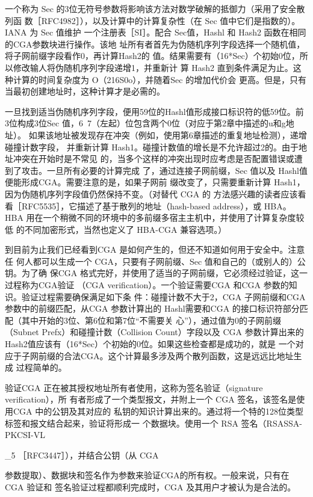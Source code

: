 一个称为 Sec 的3位无符号参数将影响该方法对数学破解的抵御力（采用了安全散列函
数［RFC4982］），以及计算中的计算复杂性（在 Sec 值中它们是指数的）。IANA 为 Sec 值维护
一个注册表［SI］。配合 Sec值，Hashl 和 Hash2 函数在相同的CGA参数块进行操作。该地
址所有者首先为伪随机序列字段选择一个随机值，将子网前缀字段看作0，再计算Hash2的
值。结果需要有（16*Sec）个初始0位，所以修改输人将伪随机序列字段递增1，并重新计
算 Hash2 直到条件满足为止。这种计算的时间复杂度为 O（216S0o），并随着Sec 的增加代价会
更高。但是，只有当最初创建地址时，这种计算才是必需的。

一旦找到适当伪随机序列字段，便用59位的Hashl值形成接口标识符的低59位。前
3位构成3位Sec 值，6~7（左起）位包含两个0位（对应于第2章中描述的u和g地址）。
如果该地址被发现存在冲突（例如，使用第6章描述的重复地址检测），递增碰撞计数字段，
并重新计算 Hash1。碰撞计数值的增长是不允许超过2的。由于地址冲突在开始时是不常见
的，当多个这样的冲突出现时应考虑是否配置错误或遭到了攻击。一旦所有必要的计算完成
了，通过连接子网前缀，Sec 值以及 Hashl值便能形成CGA。需要注意的是，如果子网前
缀改变了，只需要重新计算 Hash1，因为伪随机序列字段值仍然保持不变。（对替代 CGA 的
方法感兴趣的读者应该看看［RFC5535］，它描述了基于散列的地址（hash-based address），或
HBA。HBA 用在一个稍微不同的环境中的多前缀多宿主主机中，并使用了计算复杂度较低
的不同加密形式，当然也定义了 HBA-CGA 兼容选项。）

到目前为止我们已经看到CGA 是如何产生的，但还不知道如何用于安全中。注意任
何人都可以生成一个 CGA，只要有子网前缀、Sec 值和自己的（或别人的）公钥。为了确
保CGA 格式完好，并使用了适当的子网前缀，它必须经过验证，这一过程称为CGA验证
（CGA verification）。一个验证需要CGA 和CGA 参数的知识。验证过程需要确保满足如下条
件：碰撞计数不大于2，CGA 子网前缀和CGA 参数中的前缀匹配，从CGA 参数计算出的
Hashl需要和CGA 的接口标识符部分匹配（其中开始的3位、第6位和第7位“不需要关
心”），通过值为0的子网前缀（Subnet Prefx）和碰撞计数（Collision Count）字段以及 CGA
参数计算出来的 Hash2值应该有（16*Sec）个初始的0位。如果这些检查都是成功的，就是
一个对应于子网前缀的合法CGA。这个计算最多涉及两个散列函数，这是远远比地址生成
过程简单的。

验证CGA 正在被其授权地址所有者使用，这称为签名验证（signature verification），所
有者形成了一个类型报文，并附上一个 CGA 签名，该签名是使用CGA 中的公钥及其对应的
私钥的知识计算出来的。通过将一个特的128位类型标签和报文结合起来，验证将形成一
个数据块。使用一个 RSA 签名（RSASSA-PKCSI-VL

\_5 ［RFC3447］），并结合公钥（从 CGA

参数提取）、数据块和签名作为参数来验证CGA的所有权。一般来说，只有在CGA 验证和
签名验证过程都顺利完成时，CGA 及其用户才被认为是合法的。

